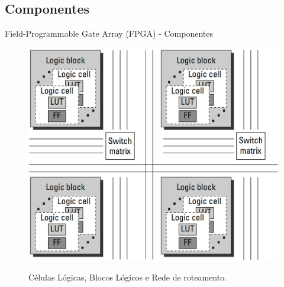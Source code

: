 \documentclass[aspectratio=169]{beamer}
\begin{document}
	\subsection{Componentes}
	\begin{frame}{Field-Programmable Gate Array (FPGA) - Componentes}
		\begin{figure}[h]
			\centering
			\caption{Células Lógicas, Blocos Lógicos e Rede de roteamento.}
			\includegraphics[height=0.8\textheight]{img/print/componentes-fpga.png}
			\label{fig:componentes-fpga}
		\end{figure}
	\end{frame}
	
\end{document}
